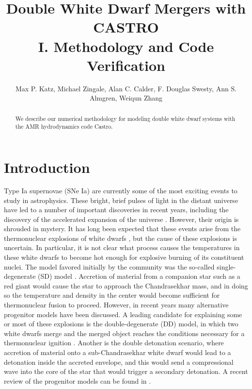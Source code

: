 \documentclass[12pt,preprint]{aastex}
\begin{document}
\title{Double White Dwarf Mergers with CASTRO\\ I. Methodology and Code 
       Verification}


\author{Max P. Katz, Michael Zingale, Alan C. Calder, F. Douglas Swesty, Ann S. Almgren, Weiqun Zhang}
\begin{abstract}
We describe our numerical methodology for modeling double white dwarf
systems with the AMR hydrodynamics code Castro.

\end{abstract}

\section{Introduction}

Type Ia supernovae (SNe Ia) are currently some of the most exciting events to study in astrophysics. These bright, brief pulses of light in the distant universe have led to a number of important discoveries in recent years, including the discovery of the accelerated expansion of the universe \citep{perlmutter1999,riess1998}. However, their origin is shrouded in mystery. It has long been expected that these events arise from the thermonuclear explosions of white dwarfs \citep{hoyle_fowler:1960}, but the cause of these explosions is uncertain. In particular, it is not clear what process causes the temperatures in these white dwarfs to become hot enough for explosive burning of its constituent nuclei. The model favored initially by the community was the so-called single-degenerate (SD) model \citep{whelan_iben:1973}. Accretion of material from a companion star such as a red giant would cause the star to approach the Chandrasekhar mass, and in doing so the temperature and density in the center would become sufficient for thermonuclear fusion to proceed. However, in recent years many alternative progenitor models have been discussed. A leading candidate for explaining some or most of these explosions is the double-degenerate (DD) model, in which two white dwarfs merge and the merged object reaches the conditions necessary for a thermonuclear ignition \citep{ibentutukov:1984,webbink:1984}. Another is the double detonation scenario, where accretion of material onto a sub-Chandrasekhar white dwarf would lead to a detonation inside the accreted envelope, and this would send a compressional wave into the core of the star that would trigger a secondary detonation. A recent review of the progenitor models can be found in \citet{hillebrandt:2013}.
\end{document}
